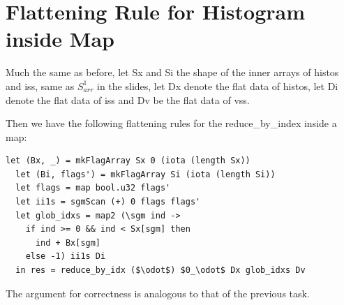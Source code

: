 \section{Flattening Rule for Histogram inside Map}\label{sec:flattening_rule_for_histogram_inside_map} %
Much the same as before, let Sx and Si the shape of the inner arrays of histos
and iss, same as $S^1_{arr}$ in the slides, let Dx denote the flat data of
histos, let Di denote the flat data of iss and Dv be the flat data of vss.

Then we have the following flattening rules for the reduce\_by\_index inside a map:
\begin{lstlisting}[mathescape=true]
  let (Bx, _) = mkFlagArray Sx 0 (iota (length Sx))
  let (Bi, flags') = mkFlagArray Si (iota (length Si))
  let flags = map bool.u32 flags'
  let ii1s = sgmScan (+) 0 flags flags'
  let glob_idxs = map2 (\sgm ind -> 
    if ind >= 0 && ind < Sx[sgm] then 
      ind + Bx[sgm] 
    else -1) ii1s Di
  in res = reduce_by_idx ($\odot$) $0_\odot$ Dx glob_idxs Dv
\end{lstlisting}

The argument for correctness is analogous to that of the previous task.
